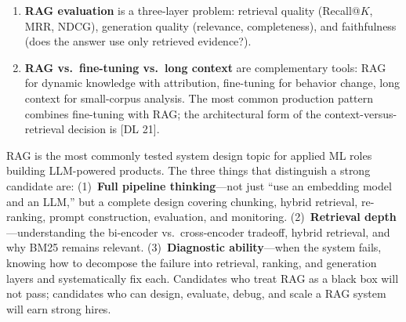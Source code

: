 \begin{enumerate}
    \item \textbf{RAG evaluation} is a three-layer problem: retrieval quality
          (Recall@$K$, MRR, NDCG), generation quality (relevance, completeness),
          and faithfulness (does the answer use only retrieved evidence?).

    \item \textbf{RAG vs.\ fine-tuning vs.\ long context} are complementary
          tools: RAG for dynamic knowledge with attribution, fine-tuning for
          behavior change, long context for small-corpus analysis.  The most
          common production pattern combines fine-tuning with RAG; the
          architectural form of the context-versus-retrieval decision is
          [DL 21].
\end{enumerate}

\bigskip
\begin{keyinsight}
RAG is the most commonly tested system design topic for applied ML roles
building LLM-powered products.  The three things that distinguish a strong
candidate are: (1)~\textbf{Full pipeline thinking}---not just ``use an
embedding model and an LLM,'' but a complete design covering chunking,
hybrid retrieval, re-ranking, prompt construction, evaluation, and monitoring.
(2)~\textbf{Retrieval depth}---understanding the bi-encoder vs.\ cross-encoder
tradeoff, hybrid retrieval, and why BM25 remains relevant.
(3)~\textbf{Diagnostic ability}---when the system fails, knowing how to
decompose the failure into retrieval, ranking, and generation layers and
systematically fix each.  Candidates who treat RAG as a black box will not
pass; candidates who can design, evaluate, debug, and scale a RAG system
will earn strong hires.
\end{keyinsight}
